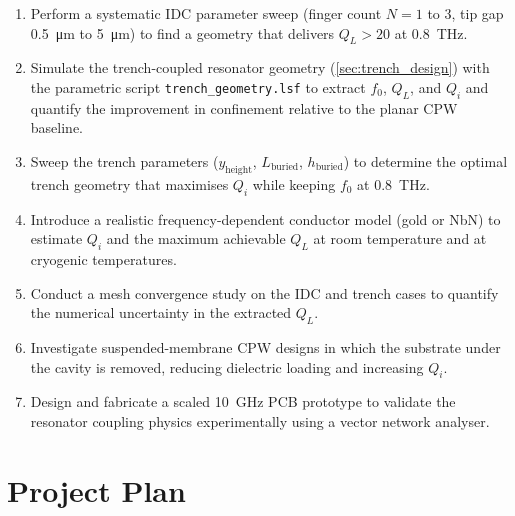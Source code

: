 \documentclass[12pt,a4paper]{article}
\begin{document}
\begin{enumerate}
    \item Perform a systematic IDC parameter sweep (finger count
          $N = 1$ to $3$, tip gap \SI{0.5}{\micro\metre} to
          \SI{5}{\micro\metre}) to find a geometry that delivers
          $Q_L > 20$ at \SI{0.8}{\tera\hertz}.
    \item Simulate the trench-coupled resonator geometry
          (\cref{sec:trench_design}) with the parametric script
          \texttt{trench\_geometry.lsf} to extract $f_0$, $Q_L$, and
          $Q_i$ and quantify the improvement in confinement relative to
          the planar CPW baseline.
    \item Sweep the trench parameters ($y_{\mathrm{height}}$,
          $L_{\mathrm{buried}}$, $h_{\mathrm{buried}}$) to determine
          the optimal trench geometry that maximises $Q_i$ while keeping
          $f_0$ at \SI{0.8}{\tera\hertz}.
    \item Introduce a realistic frequency-dependent conductor model
          (gold or NbN) to estimate $Q_i$ and the maximum achievable
          $Q_L$ at room temperature and at cryogenic temperatures.
    \item Conduct a mesh convergence study on the IDC and trench cases
          to quantify the numerical uncertainty in the extracted $Q_L$.
    \item Investigate suspended-membrane CPW designs in which the
          substrate under the cavity is removed, reducing dielectric
          loading and increasing $Q_i$.
    \item Design and fabricate a scaled \SI{10}{\giga\hertz} PCB prototype
          to validate the resonator coupling physics experimentally using
          a vector network analyser.
\end{enumerate}

\newpage



\newpage
\appendix

\section{Project Plan}
\label{app:plan}
\end{document}
